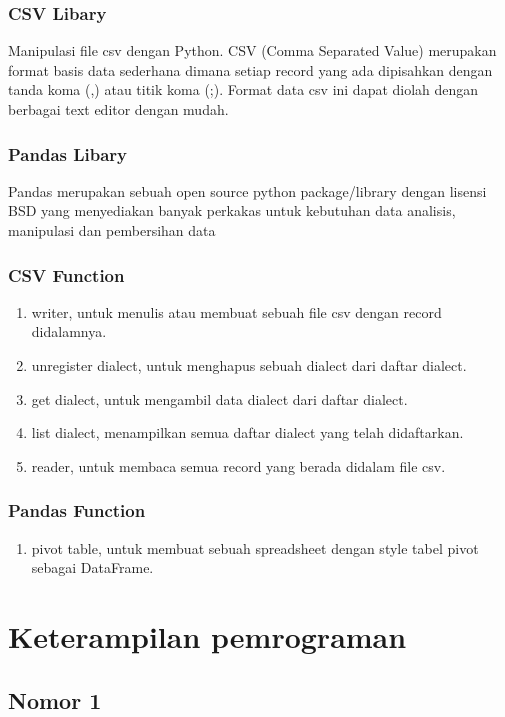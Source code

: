 \documentclass[a4paper,12pt]{report}
\begin{document}
\subsection{CSV Libary}

Manipulasi file csv dengan Python. CSV (Comma Separated Value) merupakan format basis data sederhana dimana setiap record yang ada dipisahkan dengan tanda koma (,) atau titik koma (;). Format data csv ini dapat diolah dengan berbagai text editor dengan mudah.

\subsection{Pandas Libary}
Pandas merupakan sebuah open source python package/library dengan lisensi BSD yang menyediakan banyak perkakas untuk kebutuhan data analisis, manipulasi dan pembersihan data
\subsection{CSV Function}
\begin{enumerate}
    \item writer, untuk menulis atau membuat sebuah file csv dengan record didalamnya.
    \item unregister dialect, untuk menghapus sebuah dialect dari daftar dialect.
    \item get dialect, untuk mengambil data dialect dari daftar dialect.
    \item list dialect, menampilkan semua daftar dialect yang telah didaftarkan.
    \item reader, untuk membaca semua record yang berada didalam file csv.
\end{enumerate}

\subsection{Pandas Function}
\begin{enumerate}
\item pivot table, untuk membuat sebuah spreadsheet dengan style tabel pivot sebagai DataFrame.
\end{enumerate}

\chapter{Keterampilan pemrograman}
\section*{Nomor 1}

\end{document}
